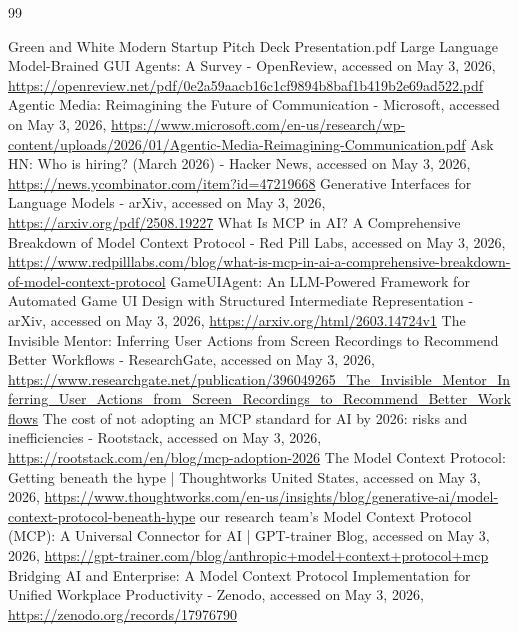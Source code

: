 \documentclass[12pt, a4paper]{report}
\begin{document}
\renewcommand{\bibname}{References}
\begin{thebibliography}{99}

 Green and White Modern Startup Pitch Deck Presentation.pdf
 Large Language Model-Brained GUI Agents: A Survey - OpenReview, accessed on May 3, 2026, \url{https://openreview.net/pdf/0e2a59aacb16c1cf9894b8baf1b419b2e69ad522.pdf}
 Agentic Media: Reimagining the Future of Communication - Microsoft, accessed on May 3, 2026, \url{https://www.microsoft.com/en-us/research/wp-content/uploads/2026/01/Agentic-Media-Reimagining-Communication.pdf}
 Ask HN: Who is hiring? (March 2026) - Hacker News, accessed on May 3, 2026, \url{https://news.ycombinator.com/item?id=47219668}
 Generative Interfaces for Language Models - arXiv, accessed on May 3, 2026, \url{https://arxiv.org/pdf/2508.19227}
 What Is MCP in AI? A Comprehensive Breakdown of Model Context Protocol - Red Pill Labs, accessed on May 3, 2026, \url{https://www.redpilllabs.com/blog/what-is-mcp-in-ai-a-comprehensive-breakdown-of-model-context-protocol}
 GameUIAgent: An LLM-Powered Framework for Automated Game UI Design with Structured Intermediate Representation - arXiv, accessed on May 3, 2026, \url{https://arxiv.org/html/2603.14724v1}
 The Invisible Mentor: Inferring User Actions from Screen Recordings to Recommend Better Workflows - ResearchGate, accessed on May 3, 2026, \url{https://www.researchgate.net/publication/396049265_The_Invisible_Mentor_Inferring_User_Actions_from_Screen_Recordings_to_Recommend_Better_Workflows}
 The cost of not adopting an MCP standard for AI by 2026: risks and inefficiencies - Rootstack, accessed on May 3, 2026, \url{https://rootstack.com/en/blog/mcp-adoption-2026}
 The Model Context Protocol: Getting beneath the hype | Thoughtworks United States, accessed on May 3, 2026, \url{https://www.thoughtworks.com/en-us/insights/blog/generative-ai/model-context-protocol-beneath-hype}
 our research team's Model Context Protocol (MCP): A Universal Connector for AI | GPT-trainer Blog, accessed on May 3, 2026, \url{https://gpt-trainer.com/blog/anthropic+model+context+protocol+mcp}
 Bridging AI and Enterprise: A Model Context Protocol Implementation for Unified Workplace Productivity - Zenodo, accessed on May 3, 2026, \url{https://zenodo.org/records/17976790}

\end{thebibliography}
\end{document}
